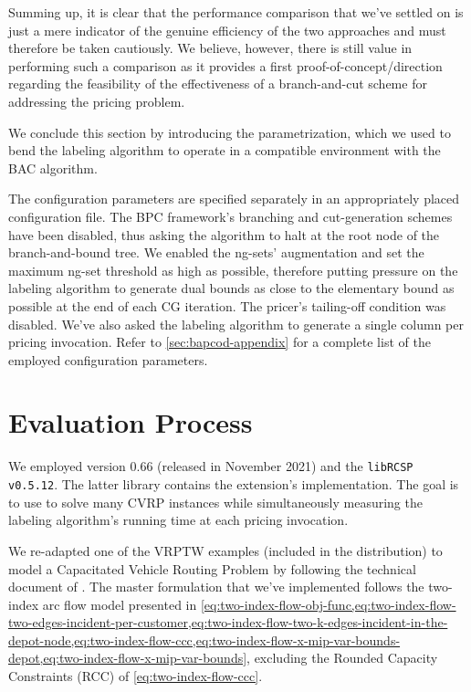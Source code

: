 Summing up, it is clear that the performance comparison that we've settled on is just
a mere indicator of the genuine efficiency of the two approaches and must
therefore be taken cautiously.
We believe, however, there is still value in performing such a comparison as it provides
a first proof-of-concept/direction regarding the feasibility of the effectiveness
of a branch-and-cut scheme for addressing the pricing problem.

\medskip

We conclude this section by introducing the \bapcod{} parametrization,
which we used to bend the labeling algorithm to operate in a compatible environment with the BAC algorithm.

The configuration parameters are specified separately
in an appropriately placed configuration file.
The BPC framework's branching and cut-generation schemes have been disabled,
thus asking the algorithm to halt at the root node of the branch-and-bound tree.
We enabled the ng-sets' augmentation and set the maximum ng-set threshold as high as possible,
therefore putting pressure on the labeling algorithm to generate dual bounds as close
to the elementary bound as possible at the end of each CG iteration.
The pricer's tailing-off condition was disabled.
We've also asked the labeling algorithm to generate
a single column per pricing invocation.
Refer to \cref{sec:bapcod-appendix} for a complete list of the employed configuration parameters.

\section{Evaluation Process}
\label{sec:results-evaluation-process}

We employed \bapcod{} version 0.66 (released in November 2021) and the \texttt{libRCSP v0.5.12}.
The latter library contains the \vrpsolver{} extension's implementation.
The goal is to use \bapcod{} to solve many CVRP instances while simultaneously
measuring the labeling algorithm's running time at each pricing invocation.

\medskip

We re-adapted one of the VRPTW examples (included in the distribution)
to model a Capacitated Vehicle Routing Problem by following
the \bapcod{} technical document of \textcite{sadykov2021}.
The master formulation that we've implemented follows the two-index arc flow model
presented in \cref{eq:two-index-flow-obj-func,eq:two-index-flow-two-edges-incident-per-customer,eq:two-index-flow-two-k-edges-incident-in-the-depot-node,eq:two-index-flow-ccc,eq:two-index-flow-x-mip-var-bounds-depot,eq:two-index-flow-x-mip-var-bounds},
excluding the Rounded Capacity Constraints (RCC) of \cref{eq:two-index-flow-ccc}.


